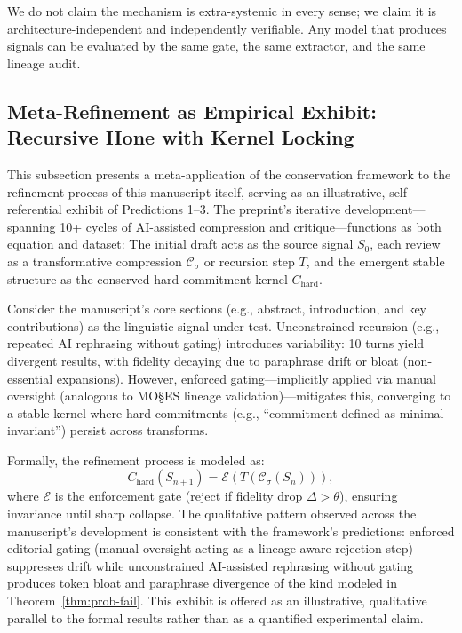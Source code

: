 \documentclass[11pt,a4paper]{article}
\begin{document}
\noindent We do not claim the mechanism is extra-systemic in every sense; we claim it is architecture-independent and independently verifiable. Any model that produces signals can be evaluated by the same gate, the same extractor, and the same lineage audit.

\subsection{Meta-Refinement as Empirical Exhibit: Recursive Hone with Kernel Locking}

This subsection presents a meta-application of the conservation framework to the refinement process of this manuscript itself, serving as an illustrative, self-referential exhibit of Predictions 1--3. The preprint's iterative development---spanning 10+ cycles of AI-assisted compression and critique---functions as both equation and dataset: The initial draft acts as the source signal $S_0$, each review as a transformative compression $\mathcal{C}_\sigma$ or recursion step $T$, and the emergent stable structure as the conserved hard commitment kernel $C_{\text{hard}}$.

Consider the manuscript's core sections (e.g., abstract, introduction, and key contributions) as the linguistic signal under test. Unconstrained recursion (e.g., repeated AI rephrasing without gating) introduces variability: 10 turns yield divergent results, with fidelity decaying due to paraphrase drift or bloat (non-essential expansions). However, enforced gating---implicitly applied via manual oversight (analogous to MO\S{}ES\texttrademark{} lineage validation)---mitigates this, converging to a stable kernel where hard commitments (e.g., ``commitment defined as minimal invariant'') persist across transforms.

Formally, the refinement process is modeled as:
\[
C_{\text{hard}}(S_{n+1}) = \mathcal{E}\left( T(\mathcal{C}_\sigma(S_n)) \right),
\]
where $\mathcal{E}$ is the enforcement gate (reject if fidelity drop $\Delta > \theta$), ensuring invariance until sharp collapse. The qualitative pattern observed across the manuscript's development is consistent with the framework's predictions: enforced editorial gating (manual oversight acting as a lineage-aware rejection step) suppresses drift while unconstrained AI-assisted rephrasing without gating produces token bloat and paraphrase divergence of the kind modeled in Theorem~\ref{thm:prob-fail}. This exhibit is offered as an illustrative, qualitative parallel to the formal results rather than as a quantified experimental claim.
\end{document}

